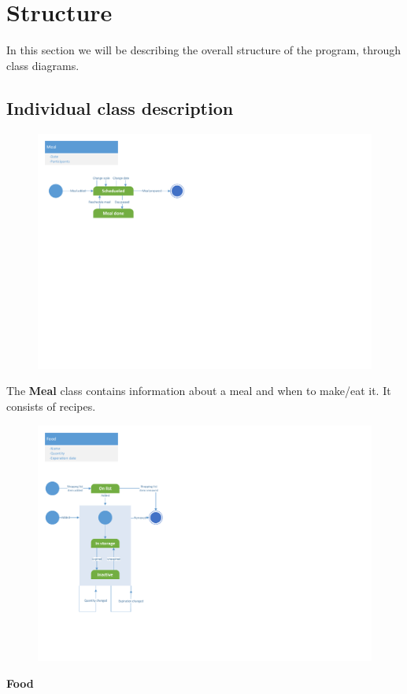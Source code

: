\section{Structure}
In this section we will be describing the overall structure of the program, through class diagrams.

\subsection{Individual class description}

\begin{figure}[H]
	\centering
	\includegraphics[width=1.0\textwidth]{Development/ProblemDomain/MealClass.pdf}
	\label{MealClass}
\end{figure}
The \textbf{Meal} class contains information about a meal and when to make/eat it. It consists of recipes.

\begin{figure}[H]
	\centering
	\includegraphics[width=1.0\textwidth]{Development/ProblemDomain/FoodClass.pdf}
	\label{FoodClass}
\end{figure}
\textbf{Food} 

